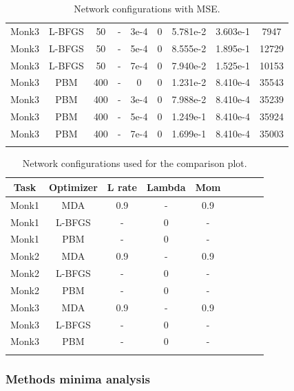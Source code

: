 \begin{center}
\begin{longtable}{|c|c|c|c|c|c|c|c|c|}
			Monk3 & L-BFGS & 50 & - & 3e-4  & 0  & 5.781e-2 & 3.603e-1 & 7947\\
			Monk3 & L-BFGS & 50 & - & 5e-4  & 0  & 8.555e-2 & 1.895e-1 & 12729\\
			Monk3 & L-BFGS & 50 & - & 7e-4  & 0  & 7.940e-2 & 1.525e-1 & 10153\\
			Monk3 & PBM & 400 & - & 0  & 0 & 1.231e-2 & 8.410e-4 & 35543\\
			Monk3 & PBM & 400 & - & 3e-4  & 0 & 7.988e-2 & 8.410e-4 & 35239\\
			Monk3 & PBM & 400 & - & 5e-4  & 0 & 1.249e-1 & 8.410e-4 & 35924\\
			Monk3 & PBM & 400 & - & 7e-4  & 0 & 1.699e-1 & 8.410e-4 & 35003\\
			\hline
			\caption{Network configurations with MSE.}
			\label{tab:nets_res}
		\end{longtable}

\end{center}

\begin{center}
	\small\addtolength{\tabcolsep}{-3pt}
	\centering
	\begin{longtable}{|c|c|c|c|c|c|c|c|c|}
		\hline
		\textbf{Task}& \textbf{Optimizer} & \textbf{L rate} & \multicolumn{1}{l|}{\textbf{Lambda}} & \textbf{Mom}  \\ \hline 
		Monk1 & MDA & 0.9 & - & 0.9    \\
		Monk1 & L-BFGS & - & 0 & -    \\
		Monk1 & PBM & - & 0 & -    \\
		Monk2 & MDA & 0.9 & - & 0.9    \\
		Monk2 & L-BFGS & - & 0 & -    \\
		Monk2 & PBM & - & 0 & -    \\
		Monk3 & MDA & 0.9 & - & 0.9    \\
		Monk3 & L-BFGS & - & 0 & -    \\
		Monk3 & PBM & - & 0 & -    \\
		\hline
		\caption{Network configurations used for the comparison plot.}
		\label{tab:nets_comp}
	\end{longtable}
\end{center}


\subsubsection{Methods minima analysis} 

